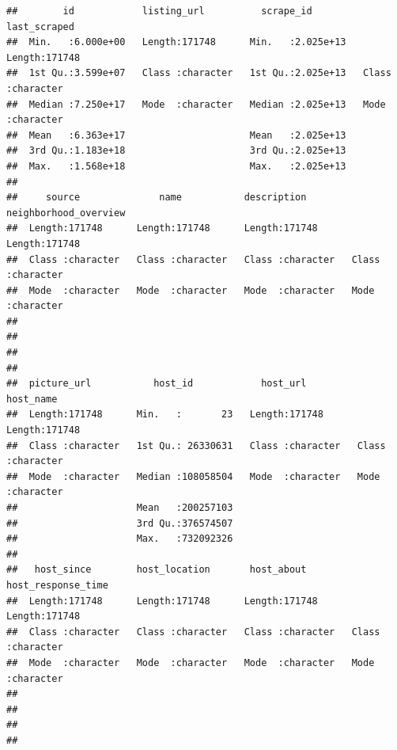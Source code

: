 \documentclass[
]{article}
\begin{document}
\begin{verbatim}
##        id            listing_url          scrape_id         last_scraped      
##  Min.   :6.000e+00   Length:171748      Min.   :2.025e+13   Length:171748     
##  1st Qu.:3.599e+07   Class :character   1st Qu.:2.025e+13   Class :character  
##  Median :7.250e+17   Mode  :character   Median :2.025e+13   Mode  :character  
##  Mean   :6.363e+17                      Mean   :2.025e+13                     
##  3rd Qu.:1.183e+18                      3rd Qu.:2.025e+13                     
##  Max.   :1.568e+18                      Max.   :2.025e+13                     
##                                                                               
##     source              name           description        neighborhood_overview
##  Length:171748      Length:171748      Length:171748      Length:171748        
##  Class :character   Class :character   Class :character   Class :character     
##  Mode  :character   Mode  :character   Mode  :character   Mode  :character     
##                                                                                
##                                                                                
##                                                                                
##                                                                                
##  picture_url           host_id            host_url          host_name        
##  Length:171748      Min.   :       23   Length:171748      Length:171748     
##  Class :character   1st Qu.: 26330631   Class :character   Class :character  
##  Mode  :character   Median :108058504   Mode  :character   Mode  :character  
##                     Mean   :200257103                                        
##                     3rd Qu.:376574507                                        
##                     Max.   :732092326                                        
##                                                                              
##   host_since        host_location       host_about        host_response_time
##  Length:171748      Length:171748      Length:171748      Length:171748     
##  Class :character   Class :character   Class :character   Class :character  
##  Mode  :character   Mode  :character   Mode  :character   Mode  :character  
##                                                                             
##                                                                             
##                                                                             
##                                                                             

\end{verbatim}
\end{document}
